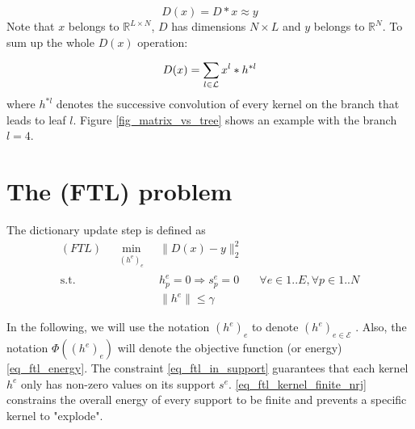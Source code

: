 $$D(x) = D*x \approx y$$
Note that $x$ belongs to $\mathbb{R}^{L\times N}$, $D$ has dimensions $N \times L$ and $y$ belongs to $\mathbb{R}^N$. To sum up the whole $D(x)$ operation:

$$
D(x) = \sum_{l \in \mathcal L} x^{l} * h^{*l}
$$
where $h^{*l}$ denotes the successive convolution of every kernel on the branch that leads to leaf $l$. Figure \ref{fig_matrix_vs_tree} shows an example with the branch $l=4$.

\section{The (FTL) problem}

The dictionary update step is defined as 
\begin{align}
(FTL) \quad \underset{\substack{(h^\text{e})_{e}}}\min & \lVert D(x) - y \rVert_2^2 \label{eq_ftl_energy}\\
\text{s.t. } & h^e_p = 0 \Rightarrow  s^e_p=0 \quad & \forall e \in 1..E, \forall p \in 1..N \label{eq_ftl_in_support} \\
 & \lVert h^e \rVert \le \gamma \label{eq_ftl_kernel_finite_nrj}
\end{align}

In the following, we will use the notation $(h^e)_{e}$ to denote $(h^e)_{e \in \mathcal{E}}$ . Also, the notation $\Phi((h^e)_{e})$ will denote the objective function (or energy) \ref{eq_ftl_energy}.
The constraint \ref{eq_ftl_in_support} guarantees that each kernel $h^e$ only has non-zero values on its support $s^e$. \ref{eq_ftl_kernel_finite_nrj} constrains the overall energy of every support to be finite and prevents a specific kernel to "explode".

